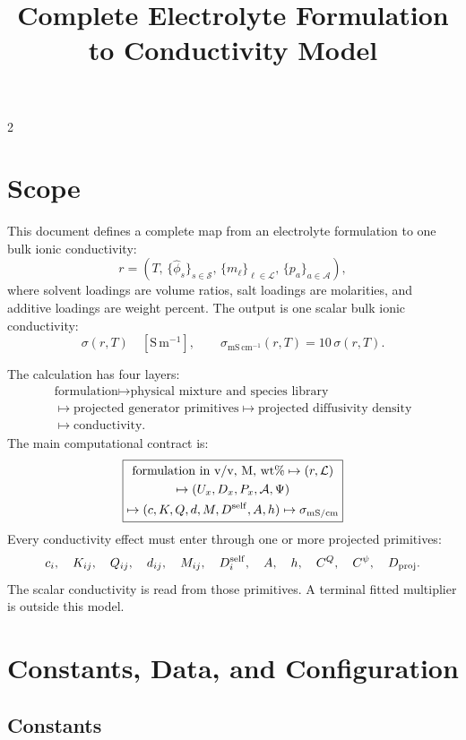 \documentclass[10pt]{article}
\title{Complete Electrolyte Formulation to Conductivity Model}
\author{}
\date{}
\newcommand{\Sm}{\mathrm{S\,m^{-1}}}
\newcommand{\mScm}{\mathrm{mS\,cm^{-1}}}
\begin{document}
\maketitle
\tableofcontents
\clearpage
\begin{multicols}{2}
\scriptsize
\RaggedRight
\raggedcolumns

\section{Scope}

This document defines a complete map from an electrolyte formulation to one
bulk ionic conductivity:
\[
r =
\left(
T,\,
\{\widehat{\phi}_s\}_{s\in\mathcal S},\,
\{m_\ell\}_{\ell\in\mathcal L},\,
\{p_a\}_{a\in\mathcal A}
\right),
\]
where solvent loadings are volume ratios, salt loadings are molarities, and
additive loadings are weight percent. The output is one scalar bulk ionic
conductivity:
\[
\sigma(r,T) \quad [\Sm],
\qquad
\sigma_{\mScm}(r,T)=10\,\sigma(r,T).
\]

The calculation has four layers:
\[
\begin{gathered}
\text{formulation}
\mapsto
\text{physical mixture and species library}\\
\mapsto
\text{projected generator primitives}
\mapsto
\text{projected diffusivity density}\\
\mapsto
\text{conductivity}.
\end{gathered}
\]
The main computational contract is:
\[
\boxed{
\begin{gathered}
\text{formulation in v/v, M, wt\%}
\mapsto (r,\mathcal L)\\
\mapsto (U_x,D_x,P_x,\mathcal A,\Psi)\\
\mapsto (c,K,Q,d,M,D^{\rm self},A,h)
\mapsto \sigma_{\rm mS/cm}
\end{gathered}
}
\]
Every conductivity effect must enter through one or more projected primitives:
\[
c_i,\quad K_{ij},\quad Q_{ij},\quad d_{ij},\quad M_{ij},\quad
D_i^{\rm self},\quad A,\quad h,\quad C^Q,\quad C^\psi,\quad D_{\rm proj}.
\]
The scalar conductivity is read from those primitives. A terminal fitted
multiplier is outside this model.

\section{Constants, Data, and Configuration}

\subsection{Constants}


\end{multicols}
\end{document}

